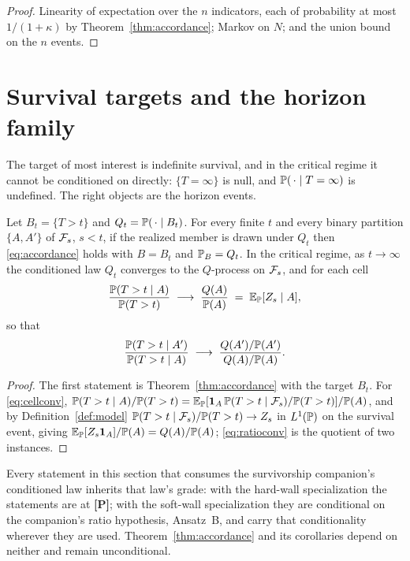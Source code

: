 \begin{proof}
Linearity of expectation over the $n$ indicators, each of probability
at most $1/(1+\kappa)$ by Theorem~\ref{thm:accordance}; Markov on $N$;
and the union bound on the $n$ events.
\end{proof}

\section{Survival targets and the horizon family}\label{sec:survival}

The target of most interest is indefinite survival, and in the critical
regime it cannot be conditioned on directly: $\{T=\infty\}$ is null, and
$\mathbb{P}(\,\cdot\mid T=\infty)$ is undefined. The right objects are the
horizon events.

\begin{theorem}\label{thm:horizon}
Let $B_t=\{T>t\}$ and $Q_t=\mathbb{P}(\,\cdot\mid B_t)$. For every finite $t$ and
every binary partition $\{A,A'\}$ of $\mathcal{F}_s$, $s<t$, if the realized member
is drawn under $Q_t$ then \eqref{eq:accordance} holds with $B=B_t$ and
$\mathbb{P}_B=Q_t$. In the critical regime, as $t\to\infty$ the conditioned law
$Q_t$ converges to the $Q$-process on $\mathcal{F}_s$, and for each cell
\begin{equation}\label{eq:cellconv}
\frac{\mathbb{P}(T>t\mid A)}{\mathbb{P}(T>t)}\;\longrightarrow\;\frac{Q(A)}{\mathbb{P}(A)}
\;=\;\mathbb{E}_{\mathbb{P}}[Z_s\mid A],
\end{equation}
so that
\begin{equation}\label{eq:ratioconv}
\frac{\mathbb{P}(T>t\mid A')}{\mathbb{P}(T>t\mid A)}\;\longrightarrow\;
\frac{Q(A')/\mathbb{P}(A')}{Q(A)/\mathbb{P}(A)}.
\end{equation}
\end{theorem}

\begin{proof}
The first statement is Theorem~\ref{thm:accordance} with the target
$B_t$. For \eqref{eq:cellconv},
$\mathbb{P}(T>t\mid A)/\mathbb{P}(T>t)=\mathbb{E}_{\mathbb{P}}[\mathbf{1}_A\,\mathbb{P}(T>t\mid\mathcal{F}_s)/\mathbb{P}(T>t)]/\mathbb{P}(A)$,
and by Definition~\ref{def:model} $\mathbb{P}(T>t\mid\mathcal{F}_s)/\mathbb{P}(T>t)\to Z_s$
in $L^1(\mathbb{P})$ on the survival event, giving $\mathbb{E}_{\mathbb{P}}[Z_s\mathbf{1}_A]/\mathbb{P}(A)
=Q(A)/\mathbb{P}(A)$; \eqref{eq:ratioconv} is the quotient of two instances.
\end{proof}

\begin{remark}\label{rem:grades}
Every statement in this section that consumes the survivorship
companion's conditioned law inherits that law's grade: with the
hard-wall specialization the statements are at \textbf{[P]}; with the
soft-wall specialization they are conditional on the companion's ratio
hypothesis, Ansatz~B, and carry that conditionality wherever they are
used. Theorem~\ref{thm:accordance} and its corollaries depend on neither
and remain unconditional.
\end{remark}

